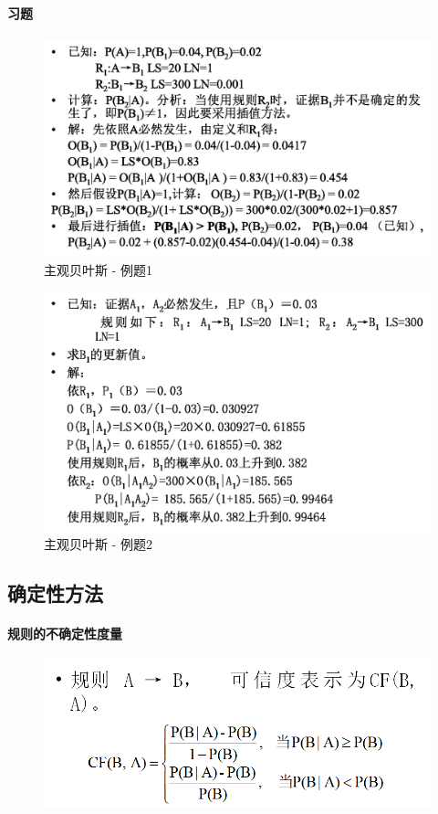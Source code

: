 \documentclass[UTF8,a4paper]{ctexart}
\begin{document}
\paragraph{习题}
\begin{figure}[H]
	\centering
	\includegraphics[scale = 0.3]{assets/ArtificialIntelligence/2018-01-09-00-20-13.png}
	\caption{主观贝叶斯 - 例题1}
\end{figure}

\begin{figure}[H]
	\centering
	\includegraphics[scale = 0.3]{assets/ArtificialIntelligence/2018-01-09-00-20-53.png}
	\caption{主观贝叶斯 - 例题2}
\end{figure}

\subsection{确定性方法}

\paragraph{规则的不确定性度量}
\begin{figure}[H]
	\centering
	\includegraphics[scale = 0.3]{assets/ArtificialIntelligence/2018-01-09-00-23-04.png}
\end{figure}
\end{document}
